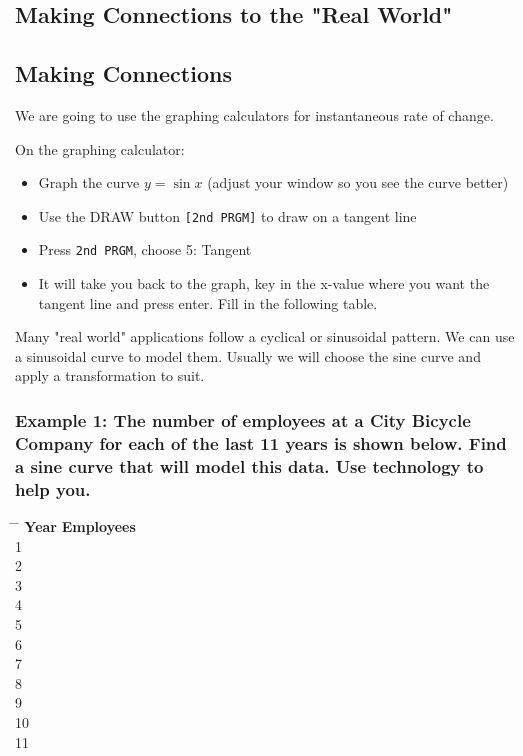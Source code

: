 \documentclass{article}
\begin{document}
\newpage

\subsection{Making Connections to the "Real World"}

\subsection*{Making Connections}
We are going to use the graphing calculators for instantaneous rate of change.

\noindent On the graphing calculator:
\begin{itemize}
    \item Graph the curve \( y = \sin x \) (adjust your window so you see the curve better)
    \item Use the DRAW button \texttt{[2nd PRGM]} to draw on a tangent line
    \item Press \texttt{2nd PRGM}, choose 5: Tangent
    \item It will take you back to the graph, key in the x-value where you want the tangent line and press enter. Fill in the following table.
\end{itemize}

\noindent Many "real world" applications follow a cyclical or sinusoidal pattern. We can use a sinusoidal curve to model them. Usually we will choose the sine curve and apply a transformation to suit.

\subsubsection*{Example 1: The number of employees at a City Bicycle Company for each of the last 11 years is shown below. Find a sine curve that will model this data. Use technology to help you.}

\begin{minipage}{0.45\textwidth}
\begin{tabbing}
\hspace{1cm} \= \hspace{2cm} \= \kill
\textbf{Year} \hspace{1cm} \= \textbf{Employees} \\
1  \\
2  \\
3  \\
4  \\
5  \\
6  \\
7  \\
8  \\
9  \\
10  \\
11  \\
\end{tabbing}
\end{minipage}
\end{document}

